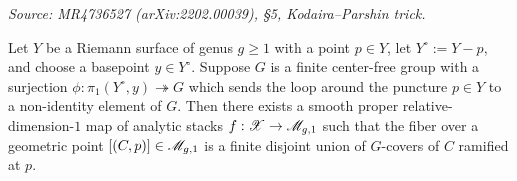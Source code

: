 \begin{proposition}
  \label{prop:kodaira-parshin}
  \textit{Source: MR4736527 (arXiv:2202.00039), §5, Kodaira--Parshin trick.}

  Let \(Y\) be a Riemann surface of genus \(g \geq 1\) with a point \(p \in Y\),
  let \(Y^\circ := Y - p\), and choose a basepoint \(y \in Y^\circ\). Suppose
  \(G\) is a finite center-free group with a surjection
  \(\phi : \pi_1(Y^\circ, y) \twoheadrightarrow G\) which sends the loop around
  the puncture \(p \in Y\) to a non-identity element of \(G\). Then there exists
  a smooth proper relative-dimension-\(1\) map of analytic stacks
  \(f : \mathscr{X} \to \mathscr{M}_{g,1}\) such that the fiber over a geometric point
  \([(C,p)] \in \mathscr{M}_{g,1}\) is a finite disjoint union of \(G\)-covers of \(C\)
  ramified at \(p\).
\end{proposition}

